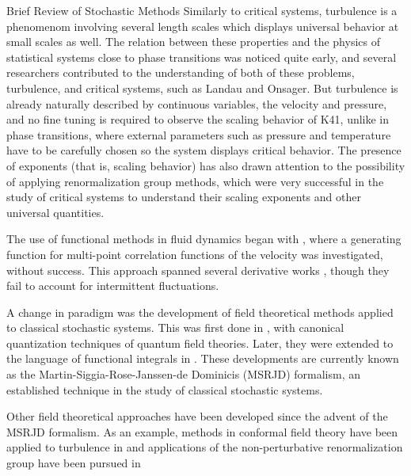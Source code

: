 \begin{chapter}{Brief Review of Stochastic Methods}
Similarly to critical systems, turbulence is a phenomenom involving
several length scales which displays universal behavior at small scales as well.
The relation between these properties and the physics of statistical
systems close to phase transitions was noticed quite early,
and several researchers contributed to the understanding of
both of these problems, turbulence, and critical systems,
such as Landau and Onsager.
But turbulence is already naturally described by continuous variables,
the velocity and pressure, and no fine tuning
is required to observe the scaling behavior of K41,
unlike in phase transitions, where external parameters such
as pressure and temperature have to be carefully
chosen so the system displays critical behavior.
The presence of exponents (that is, scaling behavior)
has also drawn attention
to the possibility of applying renormalization group methods,
which were very successful in the study of critical systems to
understand their scaling exponents and other universal quantities.

The use of functional methods in fluid dynamics began with
\textcite{hopf1952statistical},
where a generating function for multi-point correlation
functions of the velocity was investigated, without success.
This approach spanned several derivative works
\parencite{kraichnan1958higher,lewis1962space,wyld1961formulation,
tatarskii1962application,kraichnan1961dynamics},
though they fail to account for intermittent fluctuations.

A change in paradigm was the development of field
theoretical methods applied to classical stochastic systems.
This was first done in \textcite{martin1973},
with canonical quantization techniques of quantum field theories.
Later, they were extended to the language of functional
integrals in \textcite{janssen1976,dominicis1976}.
These developments are currently known as the
Martin-Siggia-Rose-Janssen-de Dominicis (MSRJD) formalism,
an established technique in the study of classical stochastic systems.

Other field theoretical approaches have been developed since the advent
of the MSRJD formalism. As an example, methods in conformal field
theory have been applied to turbulence in
\textcite{polyakov1993theory,falkovich19932d,falkovich1994universal,benzi1995conformal}
and applications of the non-perturbative renormalization group have been pursued in \textcite{mejia2012,canet2016fully}


\end{chapter}
